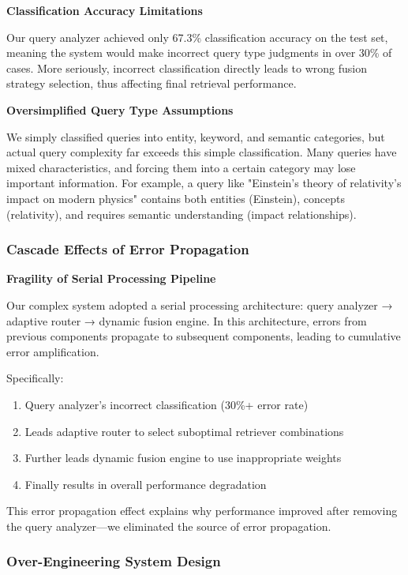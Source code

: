\documentclass[letterpaper]{article} %
\begin{document}
\textbf{Classification Accuracy Limitations}

Our query analyzer achieved only 67.3\% classification accuracy on the test set, meaning the system would make incorrect query type judgments in over 30\% of cases. More seriously, incorrect classification directly leads to wrong fusion strategy selection, thus affecting final retrieval performance.

\textbf{Oversimplified Query Type Assumptions}

We simply classified queries into entity, keyword, and semantic categories, but actual query complexity far exceeds this simple classification. Many queries have mixed characteristics, and forcing them into a certain category may lose important information. For example, a query like "Einstein's theory of relativity's impact on modern physics" contains both entities (Einstein), concepts (relativity), and requires semantic understanding (impact relationships).

\subsubsection{Cascade Effects of Error Propagation}

\textbf{Fragility of Serial Processing Pipeline}

Our complex system adopted a serial processing architecture: query analyzer → adaptive router → dynamic fusion engine. In this architecture, errors from previous components propagate to subsequent components, leading to cumulative error amplification.

Specifically:
\begin{enumerate}
\item Query analyzer's incorrect classification (30\%+ error rate)
\item Leads adaptive router to select suboptimal retriever combinations
\item Further leads dynamic fusion engine to use inappropriate weights
\item Finally results in overall performance degradation
\end{enumerate}

This error propagation effect explains why performance improved after removing the query analyzer—we eliminated the source of error propagation.

\subsubsection{Over-Engineering System Design}
\end{document}
